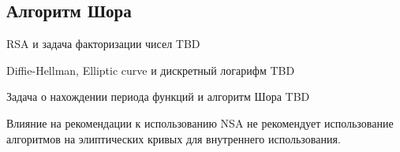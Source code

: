 \subsection{Алгоритм Шора}
\begin{frame}{RSA и задача факторизации чисел}
TBD
\end{frame}

\begin{frame}{Diffie-Hellman, Elliptic
curve и дискретный логарифм}
TBD
\end{frame}

\begin{frame}{Задача о нахождении периода функций и алгоритм Шора}
TBD
\end{frame}

\begin{frame}{Влияние на рекомендации к использованию}
NSA не рекомендует использование алгоритмов на элиптических кривых для
внутреннего использования.
\end{frame}




